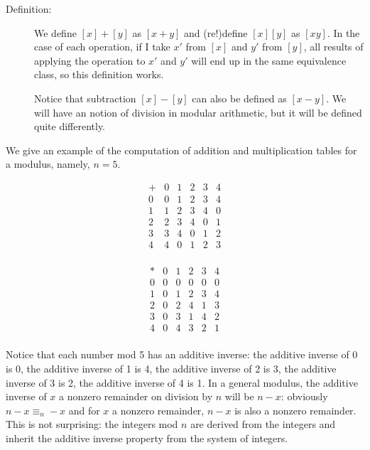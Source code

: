 \documentclass[12pt]{article}
\begin{document}
\begin{description}
\item[Definition:]  We define $[x]+[y]$ as $[x+y]$ and (re!)define $[x][y]$ as $[xy]$.  In the case of each operation,
if I take $x'$ from $[x]$ and $y'$ from $[y]$, all results of applying the operation to $x'$ and $y'$ will end up in the same equivalence class, so this definition works.

Notice that subtraction $[x]-[y]$ can also be defined as $[x-y]$.  We will have an notion of division in modular arithmetic, but it will be defined quite differently.

\end{description}

We give an example of the computation of addition and multiplication tables for a modulus, namely, $n=5$.

$$\begin{array}{c|ccccc}

+ & 0  & 1 & 2 & 3 & 4 \\ \hline
0 & 0  & 1 & 2 & 3 & 4\\
1 & 1 & 2 & 3 & 4 & 0\\
2  & 2 & 3 & 4& 0  & 1\\
3  & 3 & 4& 0  & 1 & 2\\
4  &4& 0  & 1 & 2 & 3 \\
\end{array}$$

$$\begin{array}{c|ccccc}

* & 0  & 1 & 2 & 3 & 4 \\ \hline
0 & 0  & 0 & 0 & 0 & 0\\
1 & 0 &1 & 2 & 3 & 4 \\
2  & 0 & 2 & 4& 1  & 3\\
3  & 0 & 3& 1  & 4 & 2\\
4  &0& 4  & 3 & 2 & 1 \\
\end{array}$$

Notice that each number mod 5 has an additive inverse:  the additive inverse of 0 is 0, the additive inverse of 1 is 4, the additive inverse of 2 is 3, the additive inverse of 3 is 2, the additive inverse of 4 is 1.  In a general modulus, the additive inverse of $x$ a nonzero remainder on division by $n$ will be $n-x$:  obviously $n-x \equiv_n -x$ and for $x$ a nonzero  remainder, $n-x$ is also a nonzero remainder.  This is not surprising:  the integers mod $n$ are derived from the integers and inherit the additive inverse property from the system of integers.
\end{document}
